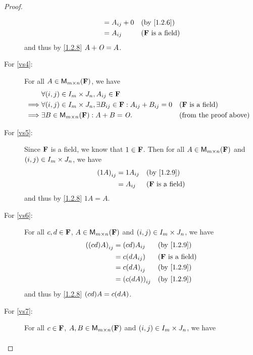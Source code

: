 \begin{proof}
\begin{description}
\begin{align*}
                          & = A_{i j} + 0         &  & \text{(by \cref{1.2.6})}   \\
                          & = A_{i j}             &  & \text{(\(\F\) is a field)}
      \end{align*}
      and thus by \cref{1.2.8} \(A + \mathit{O} = A\).
    \item[For \ref{vs4}:]
      For all \(A \in {{\mathsf{M}_{{m} \times n}({\mathbf{F}})}}\), we have
      \begin{align*}
                 & \forall \p{i, j} \in I_{m} \times J_{n}, A_{i j} \in \F                                                                    \\
        \implies & \forall \p{i, j} \in I_{m} \times J_{n}, \exists B_{i j} \in \F : A_{i j} + B_{i j} = 0 &  & \text{(\(\F\) is a field)}    \\
        \implies & \exists B \in \MS : A + B = \zm.                                                        &  & \text{(from the proof above)}
      \end{align*}
    \item[For \ref{vs5}:]
      Since \(\mathbf{F}\) is a field, we know that \(1 \in \mathbf{F}\).
      Then for all \(A \in {{\mathsf{M}_{{m} \times n}({\mathbf{F}})}}\) and \(\left\lparen i, j\right\rparen \in I_{m} \times J_{n}\), we have
      \begin{align*}
        \p{1A}_{i j} & = 1 A_{i j} &  & \text{(by \cref{1.2.9})}   \\
                     & = A_{i j}   &  & \text{(\(\F\) is a field)}
      \end{align*}
      and thus by \cref{1.2.8} \(1A = A\).
    \item[For \ref{vs6}:]
      For all \(c, d \in \mathbf{F}\), \(A \in {{\mathsf{M}_{{m} \times n}({\mathbf{F}})}}\) and \(\left\lparen i, j\right\rparen \in I_{m} \times J_{n}\), we have
      \begin{align*}
        \p{\p{cd} A}_{i j} & = \p{cd} A_{i j}      &  & \text{(by \cref{1.2.9})}   \\
                           & = c \p{d A_{i j}}     &  & \text{(\(\F\) is a field)} \\
                           & = c \p{d A}_{i j}     &  & \text{(by \cref{1.2.9})}   \\
                           & = \p{c \p{d A}}_{i j} &  & \text{(by \cref{1.2.9})}
      \end{align*}
      and thus by \cref{1.2.8} \(\p{cd} A = c \p{dA}\).
    \item[For \ref{vs7}:]
      For all \(c \in \mathbf{F}\), \(A, B \in {{\mathsf{M}_{{m} \times n}({\mathbf{F}})}}\) and \(\left\lparen i, j\right\rparen \in I_{m} \times J_{n}\), we have
      \begin{align*}

\end{align*}
\end{description}
\end{proof}
